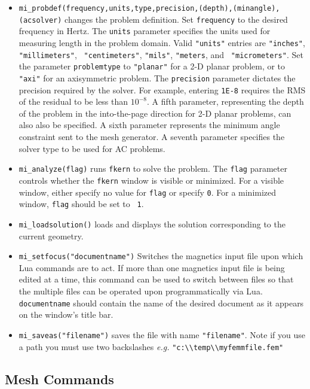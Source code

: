 \begin{itemize}
\item{\tt mi\_probdef(frequency,units,type,precision,(depth),(minangle),(acsolver)} changes the
problem definition. Set {\tt frequency} to the desired frequency in
Hertz.  The {\tt units} parameter specifies the units used for
measuring length in the problem domain.  Valid {\tt "units"}
entries are {\tt "inches"}, {\tt "millimeters"}, {\tt
"centimeters"}, {\tt "mils"}, {\tt "meters}, and {\tt
"micrometers"}. Set the parameter {\tt problemtype} to {\tt "planar"} for a 2-D
planar problem, or to {\tt "axi"} for an axisymmetric problem. The
{\tt precision} parameter dictates the precision required by the
solver.  For example, entering {\tt 1E-8} requires the RMS of the
residual to be less than $10^{-8}$.  A fifth parameter, representing the depth of
the problem in the into-the-page direction for 2-D planar problems, can also
also be specified. A sixth parameter represents the minimum angle constraint sent to the mesh generator.
A seventh parameter specifies the solver type to be used for AC problems.

\item{\tt mi\_analyze(flag)}
runs {\tt fkern} to solve the problem.  The {\tt flag} parameter
controls whether the {\tt fkern} window is visible or minimized.  For a
visible window, either specify no value for {\tt flag} or specify
{\tt 0}. For a minimized window, {\tt flag} should be set to {\tt
1}.

\item{\tt mi\_loadsolution()} loads and displays the solution corresponding to the
current geometry.

\item {\tt mi\_setfocus("documentname")} Switches the
magnetics input file upon which Lua commands are to act. If
more than one magnetics input file is being edited at a time,
this command can be used to switch between files so that the
multiple files can be operated upon programmatically via Lua. {\tt
documentname} should contain the name of the desired document as
it appears on the window's title bar.

\item{\tt mi\_saveas("filename")} saves the file with name {\tt "filename"}.
Note if you use a path you must use two backslashes {\em e.g.}
\verb+"c:\\temp\\myfemmfile.fem"+
\end{itemize}

\subsection{Mesh Commands}

